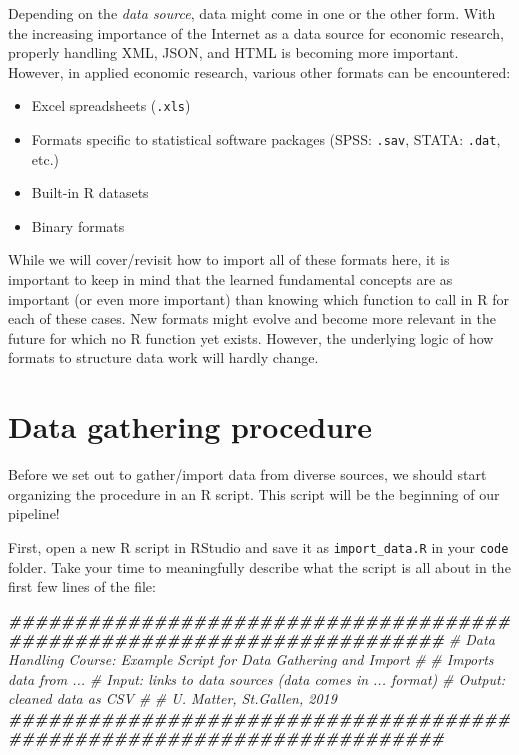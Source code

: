 \documentclass[
  12pt,
]{style/krantz}
\newenvironment{Shaded}{\begin{snugshade}}{\end{snugshade}}
\newcommand{\CommentTok}[1]{\textcolor[rgb]{0.56,0.35,0.01}{\textit{#1}}}
\newcommand{\DocumentationTok}[1]{\textcolor[rgb]{0.56,0.35,0.01}{\textbf{\textit{#1}}}}
\providecommand{\tightlist}{%
  \setlength{\itemsep}{0pt}\setlength{\parskip}{0pt}}
\begin{document}
Depending on the \emph{data source}, data might come in one or the other form. With the increasing importance of the Internet as a data source for economic research, properly handling XML, JSON, and HTML is becoming more important. However, in applied economic research, various other formats can be encountered:

\begin{itemize}
\tightlist
\item
  Excel spreadsheets (\texttt{.xls})
\item
  Formats specific to statistical software packages (SPSS: \texttt{.sav}, STATA: \texttt{.dat}, etc.)
\item
  Built-in R datasets
\item
  Binary formats
\end{itemize}

While we will cover/revisit how to import all of these formats here, it is important to keep in mind that the learned fundamental concepts are as important (or even more important) than knowing which function to call in R for each of these cases. New formats might evolve and become more relevant in the future for which no R function yet exists. However, the underlying logic of how formats to structure data work will hardly change.

\hypertarget{data-gathering-procedure}{%
\section{Data gathering procedure}\label{data-gathering-procedure}}

Before we set out to gather/import data from diverse sources, we should start organizing the procedure in an R script. This script will be the beginning of our pipeline!

First, open a new R script in RStudio and save it as \texttt{import\_data.R} in your \texttt{code} folder. Take your time to meaningfully describe what the script is all about in the first few lines of the file:

\begin{Shaded}
\begin{Highlighting}[]
\DocumentationTok{\#\#\#\#\#\#\#\#\#\#\#\#\#\#\#\#\#\#\#\#\#\#\#\#\#\#\#\#\#\#\#\#\#\#\#\#\#\#\#\#\#\#\#\#\#\#\#\#\#\#\#\#\#\#\#\#\#\#\#\#\#\#\#\#\#\#\#\#\#\#\#}
\CommentTok{\# Data Handling Course: Example Script for Data Gathering and Import}
\CommentTok{\#}
\CommentTok{\# Imports data from ...}
\CommentTok{\# Input: links to data sources (data comes in ... format)}
\CommentTok{\# Output: cleaned data as CSV}
\CommentTok{\#}
\CommentTok{\# U. Matter, St.Gallen, 2019}
\DocumentationTok{\#\#\#\#\#\#\#\#\#\#\#\#\#\#\#\#\#\#\#\#\#\#\#\#\#\#\#\#\#\#\#\#\#\#\#\#\#\#\#\#\#\#\#\#\#\#\#\#\#\#\#\#\#\#\#\#\#\#\#\#\#\#\#\#\#\#\#\#\#\#\#}
\end{Highlighting}
\end{Shaded}
\end{document}
